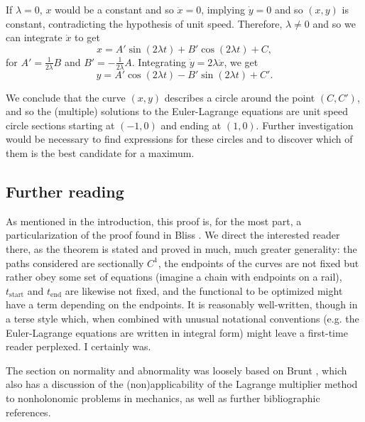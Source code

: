 \documentclass{article}
\theoremstyle{plain}
\theoremstyle{plain}
\theoremstyle{nonumberplain}
\theoremstyle{empty}
\newcommand{\tstart}{\mathrm{start}}
\newcommand{\tend}{\mathrm{end}}
\begin{document}
If $\lambda = 0$, $x$ would be a constant and so $\ddot x = 0$, implying $\dot y = 0$ and so $(x,y)$ is constant, contradicting the hypothesis of unit speed. Therefore, $\lambda \neq 0$ and so we can integrate $\dot x$ to get
\[x = A' \sin(2 \lambda t) + B' \cos(2 \lambda t) + C,\]
for $A' = \frac1{2 \lambda} B$ and $B' = -\frac1{2\lambda} A$. Integrating $\dot y = 2 \lambda \ddot x$, we get
\[y = A' \cos(2 \lambda t) - B' \sin(2 \lambda t) + C'.\]

We conclude that the curve $(x,y)$ describes a circle around the point $(C, C')$, and so the (multiple) solutions to the Euler-Lagrange equations are unit speed circle sections starting at $(-1,0)$ and ending at $(1,0)$. Further investigation would be necessary to find expressions for these circles and to discover which of them is the best candidate for a maximum.

\subsection{Further reading}

As mentioned in the introduction, this proof is, for the most part, a particularization of the proof found in Bliss \cite[pp.~187-202]{bliss}. We direct the interested reader there, as the theorem is stated and proved in much, much greater generality: the paths considered are sectionally $C^1$, the endpoints of the curves are not fixed but rather obey some set of equations (imagine a chain with endpoints on a rail), $t_\tstart$ and $t_\tend$ are likewise not fixed, and the functional to be optimized might have a term depending on the endpoints. It is reasonably well-written, though in a terse style which, when combined with unusual notational conventions (e.g. the Euler-Lagrange equations are written in integral form) might leave a first-time reader perplexed. I certainly was.

The section on normality and abnormality was loosely based on Brunt \cite[pp.~128,129]{brunt}, which also has a discussion of the (non)applicability of the Lagrange multiplier method to nonholonomic problems in mechanics, as well as further bibliographic references.
\end{document}
